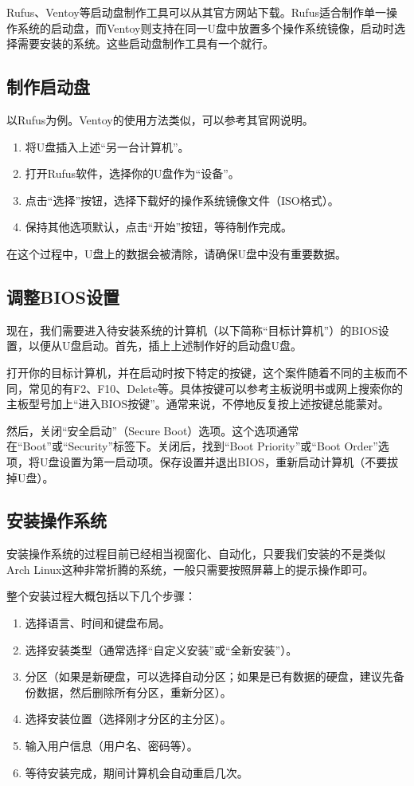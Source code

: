 Rufus、Ventoy等启动盘制作工具可以从其官方网站下载。Rufus适合制作单一操作系统的启动盘，而Ventoy则支持在同一U盘中放置多个操作系统镜像，启动时选择需要安装的系统。这些启动盘制作工具有一个就行。

\subsection{制作启动盘}

以Rufus为例。Ventoy的使用方法类似，可以参考其官网说明。

\begin{enumerate}
    \item 将U盘插入上述“另一台计算机”。
    \item 打开Rufus软件，选择你的U盘作为“设备”。
    \item 点击“选择”按钮，选择下载好的操作系统镜像文件（ISO格式）。
    \item 保持其他选项默认，点击“开始”按钮，等待制作完成。
\end{enumerate}

在这个过程中，U盘上的数据会被清除，请确保U盘中没有重要数据。

\subsection{调整BIOS设置}

现在，我们需要进入待安装系统的计算机（以下简称“目标计算机”）的BIOS设置，以便从U盘启动。首先，插上上述制作好的启动盘U盘。

打开你的目标计算机，并在启动时按下特定的按键，这个案件随着不同的主板而不同，常见的有F2、F10、Delete等。具体按键可以参考主板说明书或网上搜索你的主板型号加上“进入BIOS按键”。通常来说，不停地反复按上述按键总能蒙对。

然后，关闭“安全启动”（Secure Boot）选项。这个选项通常在“Boot”或“Security”标签下。关闭后，找到“Boot Priority”或“Boot Order”选项，将U盘设置为第一启动项。保存设置并退出BIOS，重新启动计算机（不要拔掉U盘）。

\subsection{安装操作系统}

安装操作系统的过程目前已经相当视窗化、自动化，只要我们安装的不是类似Arch Linux这种非常折腾的系统，一般只需要按照屏幕上的提示操作即可。

整个安装过程大概包括以下几个步骤：
\begin{enumerate}
    \item 选择语言、时间和键盘布局。
    \item 选择安装类型（通常选择“自定义安装”或“全新安装”）。
    \item 分区（如果是新硬盘，可以选择自动分区；如果是已有数据的硬盘，建议先备份数据，然后删除所有分区，重新分区）。
    \item 选择安装位置（选择刚才分区的主分区）。
    \item 输入用户信息（用户名、密码等）。
    \item 等待安装完成，期间计算机会自动重启几次。
\end{enumerate}

